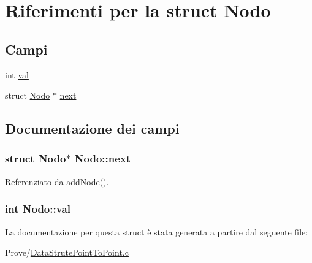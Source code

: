 \hypertarget{structNodo}{}\section{Riferimenti per la struct Nodo}
\label{structNodo}
\subsection*{Campi}
\begin{DoxyCompactItemize}
\item 
int \hyperlink{structNodo_a8b3b2d0588fbc13d39d42ddcd0bd7a4f}{val}
\item 
struct \hyperlink{structNodo}{Nodo} $\ast$ \hyperlink{structNodo_a2cf9f6e7df85ad3e124ba92fcb784ad3}{next}
\end{DoxyCompactItemize}


\subsection{Documentazione dei campi}
\hypertarget{structNodo_a2cf9f6e7df85ad3e124ba92fcb784ad3}{}
\subsubsection[{next}]{\setlength{\rightskip}{0pt plus 5cm}struct {\bf Nodo}$\ast$ Nodo\+::next}\label{structNodo_a2cf9f6e7df85ad3e124ba92fcb784ad3}


Referenziato da add\+Node().

\hypertarget{structNodo_a8b3b2d0588fbc13d39d42ddcd0bd7a4f}{}
\subsubsection[{val}]{\setlength{\rightskip}{0pt plus 5cm}int Nodo\+::val}\label{structNodo_a8b3b2d0588fbc13d39d42ddcd0bd7a4f}


La documentazione per questa struct è stata generata a partire dal seguente file\+:\begin{DoxyCompactItemize}
\item 
Prove/\hyperlink{DataStrutePointToPoint_8c}{Data\+Strute\+Point\+To\+Point.\+c}\end{DoxyCompactItemize}
